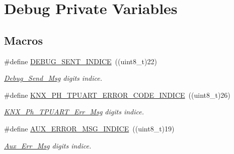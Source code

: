 \hypertarget{group___debug___private___variables}{}\section{Debug Private Variables}
\label{group___debug___private___variables}
\subsection*{Macros}
\begin{DoxyCompactItemize}
\item 
\#define \hyperlink{group___debug___private___variables_gad1fee91c32605ffbbb44ee4f8e6de6a4}{D\+E\+B\+U\+G\+\_\+\+S\+E\+N\+T\+\_\+\+I\+N\+D\+I\+CE}~((uint8\+\_\+t)22)\hypertarget{group___debug___private___variables_gad1fee91c32605ffbbb44ee4f8e6de6a4}{}\label{group___debug___private___variables_gad1fee91c32605ffbbb44ee4f8e6de6a4}

\begin{DoxyCompactList}\small\item\em \hyperlink{group___debug___private___variables_ga8dc7f546fccea9be95d04715b6de6286}{Debug\+\_\+\+Send\+\_\+\+Msg} digits indice. \end{DoxyCompactList}\item 
\#define \hyperlink{group___debug___private___variables_ga046666f21030033a99a96f6a349b43e9}{K\+N\+X\+\_\+\+P\+H\+\_\+\+T\+P\+U\+A\+R\+T\+\_\+\+E\+R\+R\+O\+R\+\_\+\+C\+O\+D\+E\+\_\+\+I\+N\+D\+I\+CE}~((uint8\+\_\+t)26)\hypertarget{group___debug___private___variables_ga046666f21030033a99a96f6a349b43e9}{}\label{group___debug___private___variables_ga046666f21030033a99a96f6a349b43e9}

\begin{DoxyCompactList}\small\item\em \hyperlink{group___debug___private___variables_gac42157f7c2b868252acf6b58cfa30aee}{K\+N\+X\+\_\+\+Ph\+\_\+\+T\+P\+U\+A\+R\+T\+\_\+\+Err\+\_\+\+Msg} digits indice. \end{DoxyCompactList}\item 
\#define \hyperlink{group___debug___private___variables_ga18ae1c752b89b0190c4adbff64c7e36e}{A\+U\+X\+\_\+\+E\+R\+R\+O\+R\+\_\+\+M\+S\+G\+\_\+\+I\+N\+D\+I\+CE}~((uint8\+\_\+t)19)\hypertarget{group___debug___private___variables_ga18ae1c752b89b0190c4adbff64c7e36e}{}\label{group___debug___private___variables_ga18ae1c752b89b0190c4adbff64c7e36e}

\begin{DoxyCompactList}\small\item\em \hyperlink{group___debug___private___variables_gab56635544aea253fe5a75ded7dda1b2f}{Aux\+\_\+\+Err\+\_\+\+Msg} digits indice. \end{DoxyCompactList}\end{DoxyCompactItemize}
